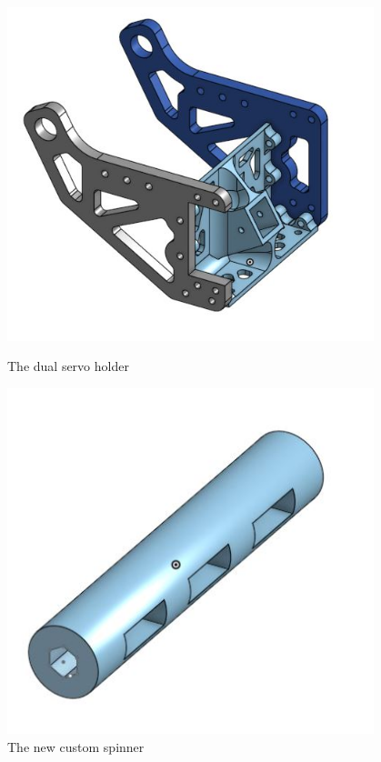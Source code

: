 \begin{figure}[ht]
\centering
\begin{minipage}[b]{.48\textwidth}
  \centering
  \includegraphics[width=0.95\textwidth]{Meetings/January/01-08-22/1-8-21_Hardware_Figure3 - Nathan Forrer.JPG}
  \caption{The dual servo holder}
  \label{fig:010822_3}
\end{minipage}%
\hfill%
\begin{minipage}[b]{.48\textwidth}
  \centering
  \includegraphics[width=0.95\textwidth]{Meetings/January/01-08-22/1-8-21_Hardware_Figure4 - Nathan Forrer.JPG}
  \caption{The new custom spinner}
  \label{fig:010822_4}
\end{minipage}
\end{figure}




